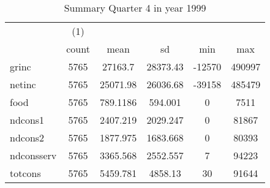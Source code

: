 \begin{table}[htbp]\centering
\def\sym#1{\ifmmode^{#1}\else\(^{#1}\)\fi}
\caption{Summary Quarter 4 in year 1999 \label{sum\_Q4\_y1999}}
\begin{tabular}{l*{1}{ccccc}}
\hline\hline
            &\multicolumn{1}{c}{(1)}&            &            &            &            \\
            &       count&        mean&          sd&         min&         max\\
\hline
grinc       &        5765&     27163.7&    28373.43&      -12570&      490997\\
netinc      &        5765&    25071.98&    26036.68&      -39158&      485479\\
food        &        5765&    789.1186&     594.001&           0&        7511\\
ndcons1     &        5765&    2407.219&    2029.247&           0&       81867\\
ndcons2     &        5765&    1877.975&    1683.668&           0&       80393\\
ndconsserv  &        5765&    3365.568&    2552.557&           7&       94223\\
totcons     &        5765&    5459.781&     4858.13&          30&       91644\\
\hline\hline
\end{tabular}
\end{table}
